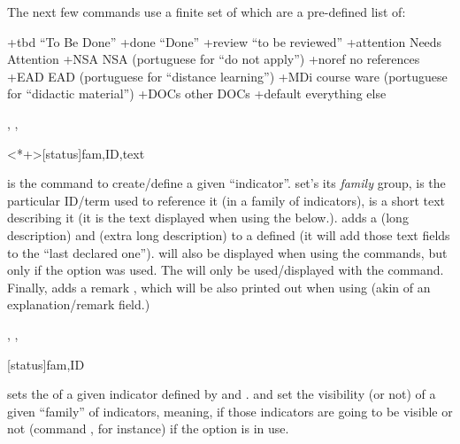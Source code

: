 \documentclass[dctools,english,tocdepth=3,secdepth=3]{ufrgscca} %
\begin{document}
The next few commands use a finite set of  which are a pre-defined list of:
\begin{Values+}
    \DescribeValue+{tbd} “To Be Done”%
    \DescribeValue+{done} “Done”%
    \DescribeValue+{review} “to be reviewed”%
    \DescribeValue+{attention} Needs Attention%
    \DescribeValue+{NSA} NSA (portuguese for “do not apply”)%
    \DescribeValue+{noref} no references%
    \DescribeValue+{EAD} EAD (portuguese for “distance learning”)%
    \DescribeValue+{MDi} course ware (portuguese for “didactic material”) %
    \DescribeValue+{DOCs} other DOCs%
    \DescribeValue+{default} everything else%
\end{Values+}

\begin{Macros}{\declareindicator, \indicatorDesc, \indicatorText}
	\begin{Syntax}%
		\Macro{\declareindicator}<*+>[status]{fam,ID,text}
	\end{Syntax}
\Macro{\declareindicator}{} is the command to create/define a given “indicator”.  set's its \emph{family} group,  is the particular ID/term used to reference it (in a family of indicators),  is a short text describing it (it is the text displayed when using the \Macro{\indref}{} below.). \Macro{\indicatorDesc}{} adds a  (long description) and  (extra long description) to a defined \Macro{\declareindicator}{} (it will add those text fields to the “last declared one”).  will also be displayed when using the \Macro{\indref}{} commands, but only if the  option was used. The  will only be used/displayed with the \Macro{\PrintIndicators}{} command. Finally,  adds a remark , which will be also printed out when using  \Macro{\lstind}{} (akin of an explanation/remark field.)
\end{Macros}

\begin{Macros}{\indsetstatus, \indsetview, \indsethide}
	\begin{Syntax}%
	\Macro{\indsetstatus}[status]{fam,ID}
	\Macro{\indsetview}{fam}
	\Macro{\indsethide}{fam}
\end{Syntax}
 sets the  of a given indicator defined by  and . \Macro{\indsetview}{} and  set the visibility (or not) of a given “family” of indicators, meaning, if those indicators are going to be visible or not (command \Macro{\indref}{}, for instance) if the option  is in use.
\end{Macros}
\end{document}
